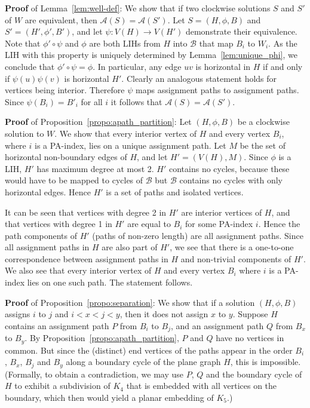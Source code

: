 \documentclass{llncs}
\newcommand{\QED}{\hspace*{\fill}{$\Box$}\medskip}
\newcommand{\BW}{\mathcal{B}}
\newcommand{\AS}{\mathcal{A}}
\begin{document}
{\bf Proof} of Lemma~\ref{lem:well-def}:
We show that if two clockwise solutions $S$ and $S'$ of $W$ are equivalent, then $\AS(S)=\AS(S')$.
Let $S=(H,\phi,B)$ and $S'=(H',\phi',B')$, and let $\psi:V(H)\rightarrow V(H')$ demonstrate their equivalence. 
Note that $\phi'\circ\psi$ and $\phi$ are both LIHs from $H$ into $\BW$ that map $B_i$ to $W_i$. As the LIH with this property is uniquely determined by Lemma~\ref{lem:unique_phi}, we conclude that $\phi'\circ\psi=\phi$.
In particular, any edge $uv$ is horizontal in $H$ if and only if $\psi(u)\psi(v)$ is horizontal $H'$. Clearly an analogous statement holds for vertices being interior. Therefore $\psi$ maps assignment paths to assignment paths. Since $\psi(B_i)=B'_i$ for all $i$ it follows that $\AS(S)=\AS(S')$.
\QED


{\bf Proof} of Proposition~\ref{propo:apath_partition}:
Let $(H,\phi,B)$ be a clockwise solution to $W$. We show that every interior vertex of $H$ and every vertex $B_i$, where $i$ is a PA-index, lies on a unique assignment path.
Let $M$ be the set of horizontal non-boundary edges of $H$, 
and let $H'=(V(H),M)$. 
Since $\phi$ is a LIH, $H'$ has maximum degree at most 2. $H'$ contains no cycles, because these would have to be mapped to cycles of $\BW$ but $\BW$ contains no cycles with only horizontal edges. Hence $H'$ is a set of paths and isolated vertices.

It can be seen that vertices with degree 2 in $H'$ are interior vertices of $H$, and that vertices with degree 1 in $H'$ are equal to $B_i$ for some PA-index $i$.
Hence the path components of $H'$ (paths of non-zero length)
are all assignment paths. 
Since all assignment paths in $H$ are also part of $H'$, we see that there is a one-to-one correspondence between assignment paths in $H$ and non-trivial components of $H'$. 
We also see that every interior vertex of $H$ and every vertex $B_i$ where $i$ is a PA-index lies on one such path. The statement follows.\QED


{\bf Proof} of Proposition~\ref{propo:separation}:
We show that if a solution $(H,\phi,B)$ assigns $i$ to $j$ and $i<x<j<y$, then it does not assign $x$ to $y$.
Suppose $H$ contains an assignment path $P$ from $B_i$ to $B_j$, and an assignment path $Q$ from $B_x$ to $B_y$. 
By Proposition~\ref{propo:apath_partition}, $P$ and $Q$ have no vertices in common.
But since the (distinct) end vertices of the paths appear in the order $B_i$, $B_x$, $B_j$ and $B_y$ along a boundary cycle of the plane graph $H$, this is impossible.
(Formally, to obtain a contradiction, we may use $P$, $Q$ and the boundary cycle of $H$ to exhibit a subdivision of $K_4$ that is embedded with all vertices on the boundary, which then would yield a planar embedding of $K_5$.)
\QED
\end{document}
